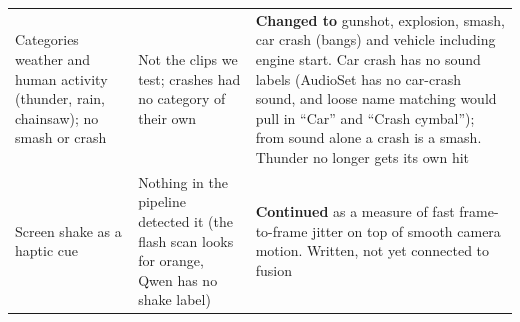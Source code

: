 \documentclass[11pt,a4paper]{article}
\begin{document}
\begin{center}
\begin{tabularx}{\textwidth}{@{}>{\raggedright\arraybackslash}p{4cm}>{\raggedright\arraybackslash}p{4cm}>{\raggedright\arraybackslash}X@{}}
\addlinespace
Categories weather and human activity (thunder, rain, chainsaw); no smash or crash & Not the clips we test; crashes had no category of their own & \textbf{Changed to} gunshot, explosion, smash, car crash (bangs) and vehicle including engine start. Car crash has no sound labels (AudioSet has no car-crash sound, and loose name matching would pull in ``Car'' and ``Crash cymbal''); from sound alone a crash is a smash. Thunder no longer gets its own hit \\
\addlinespace
Screen shake as a haptic cue & Nothing in the pipeline detected it (the flash scan looks for orange, Qwen has no shake label) & \textbf{Continued} as a measure of fast frame-to-frame jitter on top of smooth camera motion. Written, not yet connected to fusion \\
\bottomrule
\end{tabularx}
\end{center}
\end{document}

